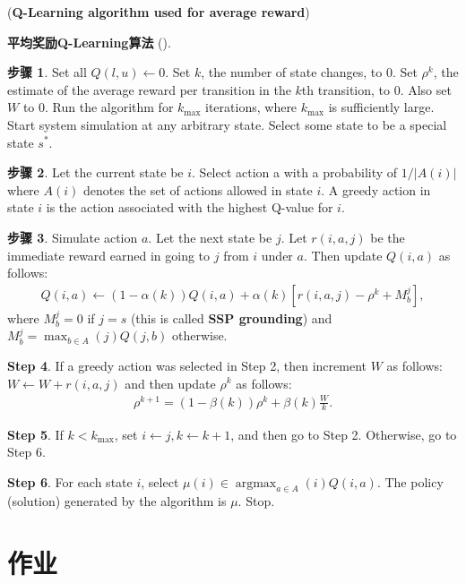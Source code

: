 (\textbf{Q-Learning algorithm used for average reward})

\textbf{平均奖励Q-Learning算法} (\cite{gosavi2004reinforcement}).

\textbf{步骤 1}. Set all $Q(l,u) \leftarrow 0$. Set $k$, the number of state changes, to 0. Set $\rho^k$, the estimate of the average reward
per transition in the $k$th transition, to 0. Also set $W$ to 0. Run the algorithm for $k_{\max}$ iterations, where $k_{\max}$ is sufficiently large. Start system simulation at any arbitrary state. Select some state to be a special state $s^{*}$.

\textbf{步骤 2}. Let the current state be $i$. Select action a with a probability of $1/|A (i)|$ where $A(i)$ denotes the set of
actions allowed in state $i$. A greedy action in state $i$ is the action associated with the highest Q-value for $i$.

\textbf{步骤 3}. Simulate action $a$. Let the next state be $j$. Let $r(i, a, j)$ be the immediate reward earned in going to $j$ from $i$ under $a$. Then update $Q(i,a)$ as follows:
\begin{eqnarray}
  Q(i,a)\leftarrow (1-\alpha(k))Q(i,a)+\alpha(k)[r(i,a,j)-\rho^k+M_b^j],
\end{eqnarray}
where $M_b^j= 0$ if $j = s$ (this is called \textbf{SSP grounding}) and $M^j_b= \max_{b\in A}(j)Q(j,b)$ otherwise.

\textbf{Step 4}. If a greedy action was selected in Step 2, then increment $W$ as follows: $W \leftarrow W + r(i, a, j)$ and then update $\rho^k$ as follows:
\begin{eqnarray}
  \rho^{k+1}= (1 - \beta(k))\rho^k+ \beta(k)\frac{W}{k}.
\end{eqnarray}

\textbf{Step 5}. If $k < k_{\max}$, set $i \leftarrow j, k \leftarrow k + 1$, and then go to Step 2. Otherwise, go to Step 6.

\textbf{Step 6}. For each state $i$, select $\mu(i)\in  \mathop{\arg\max}_{a\in A }(i)Q(i, a)$. The policy (solution) generated by the algorithm is $\mu$. Stop.

\section{作业}